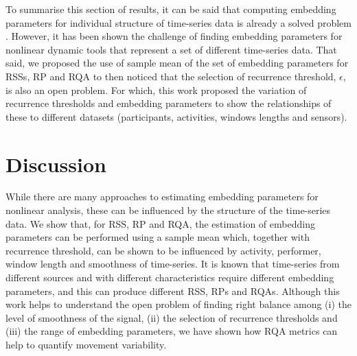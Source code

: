 \documentclass[fleqn,10pt]{wlscirep}
\begin{document}
To summarise this section of results, it can be said that computing embedding parameters for individual structure of time-series data is already a solved problem \cite{frank2010, sama2013, bradley2015}.
However, it has been shown the challenge of finding embedding parameters for nonlinear dynamic tools that represent a set of different time-series data.
That said, we proposed the use of sample mean of the set of embedding parameters for RSSs, RP and RQA to then noticed that the selection of recurrence threshold, $\epsilon$, is also an open problem.
For which, this work proposed the variation of recurrence thresholds and embedding parameters to show the relationships of these to different datasets (participants, activities, windows lengths and sensors).

\section*{Discussion}
While there are many approaches to estimating embedding parameters for nonlinear analysis, these can be influenced by the structure of the time-series data.
We show that, for RSS, RP and RQA, the estimation of embedding parameters can be performed using a sample mean which, together with recurrence threshold, can be shown to be influenced by activity, performer, window length and smoothness of time-series.
It is known that time-series from different sources and with different characteristics require different embedding parameters, and this can produce different RSS, RPs and RQAs.
Although this work helps to understand the open problem of finding right balance among (i) the level of smoothness of the signal, (ii) the selection of recurrence thresholds and (iii) the range of embedding parameters, we have shown how RQA metrics can help to quantify movement variability.
\end{document}
